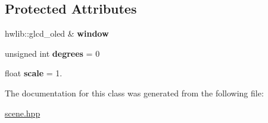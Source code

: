 \subsection*{Protected Attributes}
\begin{DoxyCompactItemize}
\item 
\mbox{\label{class_graphics_object_a0e49dd99a0687a72c72f47d04e572af6}} 
hwlib\+::glcd\+\_\+oled \& {\bfseries window}
\item 
\mbox{\label{class_graphics_object_a458673ac1ed2d83080ca5749790c2bc1}} 
unsigned int {\bfseries degrees} = 0
\item 
\mbox{\label{class_graphics_object_af5e6a5ff6615592178c41495fd36f350}} 
float {\bfseries scale} = 1.
\end{DoxyCompactItemize}


The documentation for this class was generated from the following file\+:\begin{DoxyCompactItemize}
\item 
\mbox{\hyperlink{scene_8hpp}{scene.\+hpp}}\end{DoxyCompactItemize}

